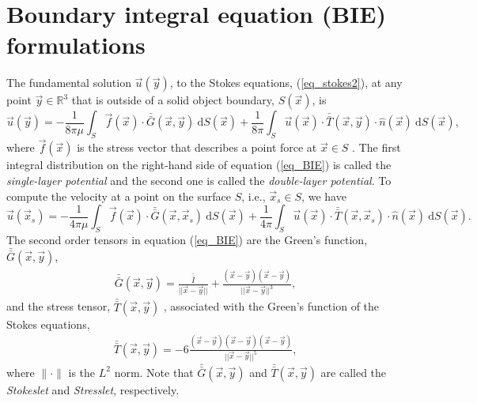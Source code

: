 \section{Boundary integral equation (BIE) formulations} 
The fundamental solution $\vec{u}(\vec{y})$, to the Stokes equations, (\ref{eq_stokes2}), at any point $\vec{y} \in \mathbb{R}^3$ that is outside of a solid object boundary, $S(\vec{x})$, is
\begin{equation}
   \vec{u}(\vec{y}) =
	- \frac{1}{8 \pi \mu} \int_S  \vec{f}(\vec{x}) \cdot \bar{\bar{G}}(\vec{x},\vec{y}) \ \text{d}S(\vec{x}) 
+ \frac{1}{8 \pi} \int_S
\vec{u}(\vec{x}) \cdot  \bar{\bar{T}}(\vec{x},\vec{y})  
\cdot \hat{n} ( \vec{x})
\ \text{d}S(\vec{x}),
\label{eq_BIE}
\end{equation}
where  $\vec{f}(\vec{x})$ is the stress vector that describes a point force at $\vec{x} \in S$ \cite{pozrikidis_boundary_1992}.
The first integral distribution on the right-hand side of equation (\ref{eq_BIE}) is called the \textit{single-layer potential} and the second one is called the \textit{double-layer potential}. 
To compute the velocity at a point on the surface $S$, i.e., $ \vec{x}_s \in S$, we have 
\begin{equation}
   \vec{u}(\vec{x}_s) = - \frac{1}{4 \pi \mu} \int_S  \vec{f}(\vec{x}) \cdot \bar{\bar{G}}(\vec{x},\vec{x}_s) \ \text{d}S(\vec{x}) 
+ \frac{1}{4 \pi} 
\int_S
\vec{u}(\vec{x}) \cdot  \bar{\bar{T}}(\vec{x},\vec{x}_s)  
\cdot \hat{n} ( \vec{x})
\ \text{d}S(\vec{x}).
\label{eq_BIE_onS}
\end{equation}
The second order tensors in equation (\ref{eq_BIE}) are the Green's function,  $\bar{\bar{G}}(\vec{x},\vec{y})$,
\begin{align}
  \bar{\bar{G}}(\vec{x},\vec{y}) =   
  \frac{\bar{\bar{I}}}{||\vec{x}-\vec{y}||} + \frac{(\vec{x}-\vec{y})(\vec{x}-\vec{y})}{||\vec{x}-\vec{y}||^3},
  \label{eq_stokeslet}
  \end{align}
  and the stress tensor, $\bar{\bar{T}}(\vec{x},\vec{y})$ , associated with the Green's function of the Stokes equations,
  \begin{align}
  \bar{\bar{T}}(\vec{x},\vec{y}) = 
  -6\frac{(\vec{x}-\vec{y})(\vec{x}-\vec{y}) (\vec{x}-\vec{y})}{||\vec{x}-\vec{y}||^5},
  \label{eq_stresslet}
  \end{align}
where $\| \cdot \|$ is the $L^2$ norm. 
Note that $ \bar{\bar{G}}(\vec{x},\vec{y})$ and $ \bar{\bar{T}}(\vec{x},\vec{y}) $ are called  the {\textit{Stokeslet}} and {\textit{Stresslet}}, respectively.
